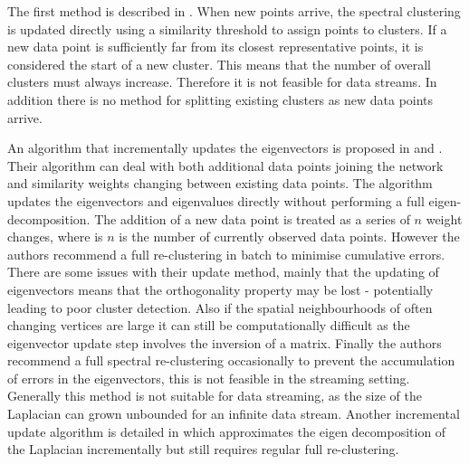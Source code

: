 

The first method is described in \cite{Valgren2008}. When new points arrive, the spectral clustering is updated directly using a similarity threshold to assign points to clusters. If a new data point is sufficiently far from its closest representative points, it is considered the start of a new cluster. This means that the number of overall clusters  must always increase. Therefore it is not feasible for data streams. In addition there is no method for splitting existing clusters as new data points arrive. %

An algorithm that incrementally updates the eigenvectors is proposed in \cite{Ning2007} and  \cite{Ning2010}. Their algorithm can deal with both additional data points joining the network and similarity weights changing between existing data points. The algorithm updates the eigenvectors and eigenvalues directly without performing a full eigen-decomposition. The addition of a new data point is treated as a series of $n$ weight changes, where is $n$ is the number of currently observed data points.  However the authors recommend a full re-clustering in batch to minimise cumulative errors. There are some issues with their update method, mainly that the updating of eigenvectors means that the orthogonality property may be lost - potentially leading to poor cluster detection. Also if the spatial neighbourhoods of often changing vertices are large it can still be computationally difficult as the eigenvector update step involves the inversion of a matrix. Finally the authors recommend a full spectral re-clustering occasionally to prevent the accumulation of errors in the eigenvectors, this is not feasible in the streaming setting. Generally this method is not suitable for data streaming, as the size of the Laplacian can grown unbounded for an infinite data stream. Another incremental update algorithm is detailed in \cite{Dhanjal2014} which approximates the eigen decomposition of the Laplacian incrementally but still requires regular full re-clustering. %

